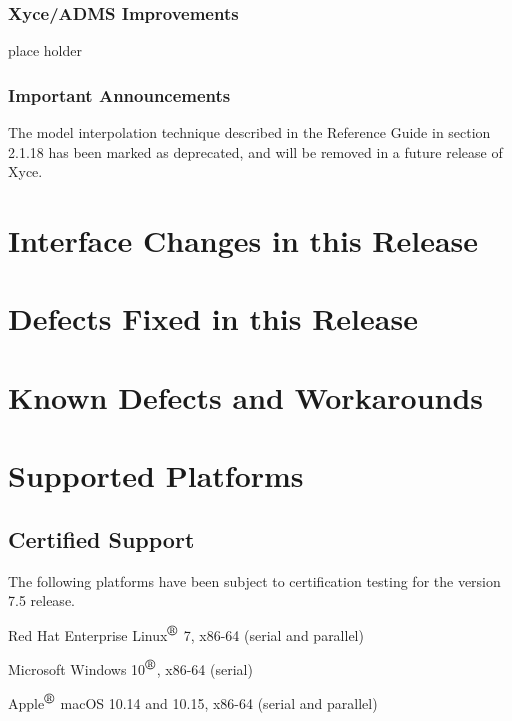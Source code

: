 \documentclass[letterpaper]{scrartcl}
\begin{document}
\subsubsection*{Xyce/ADMS Improvements}
\begin{XyceItemize}
  \item place holder
\end{XyceItemize}

\subsubsection*{Important Announcements}
\begin{XyceItemize}
\item The model interpolation technique described in the \Xyce{}
  Reference Guide in section 2.1.18 has been marked as deprecated, and
  will be removed in a future release of Xyce.
\end{XyceItemize}

\newpage
\section{Interface Changes in this Release}


\newpage
\section{Defects Fixed in this Release}


\newpage
\section{Known Defects and Workarounds}


\newpage
\section{Supported Platforms}
\subsection*{Certified Support}
The following platforms have been subject to certification testing for the
\Xyce{} version 7.5 release.
\begin{XyceItemize}
  \item Red Hat Enterprise Linux${}^{\mbox{\textregistered}}$ 7, x86-64 (serial and parallel)
  \item Microsoft Windows 10${}^{\mbox{\textregistered}}$, x86-64 (serial)
  \item Apple${}^{\mbox{\textregistered}}$ macOS 10.14 and 10.15, x86-64 (serial and parallel)
\end{XyceItemize}
\end{document}
